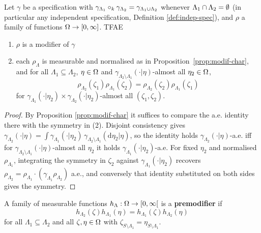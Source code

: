 \begin{proposition}
    \label{prop:modif-indep-char}
    \leanok{}

    Let $\gamma$ be a specification with
    $\gamma_{\Lambda_1} \circ_k \gamma_{\Lambda_2} = \gamma_{\Lambda_1 \cup \Lambda_2}$ whenever
    $\Lambda_1 \cap \Lambda_2 = \emptyset$ (in particular any independent specification,
    Definition \ref{def:indep-spec}), and $\rho$ a family of functions $\Omega \to [0,\infty]$.
    TFAE
    \begin{enumerate}
        \item $\rho$ is a modifier of $\gamma$
        \item each $\rho_\Lambda$ is measurable and normalised as in
        Proposition~\ref{prop:modif-char}, and for all $\Lambda_1 \subseteq \Lambda_2$,
        $\eta \in \Omega$ and $\gamma_{\Lambda_2 \setminus \Lambda_1}(\cdot|\eta)$-almost all
        $\eta_2 \in \Omega$,
        \[\rho_{\Lambda_2}(\zeta_1)\rho_{\Lambda_1}(\zeta_2) = \rho_{\Lambda_2}(\zeta_2) \rho_{\Lambda_1}(\zeta_1)\]
        for $\gamma_{\Lambda_1}(\cdot|\eta_2) \times \gamma_{\Lambda_2}(\cdot|\eta_2)$-almost all $(\zeta_1, \zeta_2)$.
    \end{enumerate}
\end{proposition}
\begin{proof}

    By Proposition \ref{prop:modif-char} it suffices to compare the a.e. identity there with the
    symmetry in (2). Disjoint consistency gives
    $\gamma_{\Lambda_2}(\cdot|\eta) = \int \gamma_{\Lambda_1}(\cdot|\eta_2)\,
    \gamma_{\Lambda_2\setminus\Lambda_1}(\mathrm{d}\eta_2|\eta)$, so the identity holds
    $\gamma_{\Lambda_2}(\cdot|\eta)$-a.e. iff for $\gamma_{\Lambda_2\setminus\Lambda_1}(\cdot|\eta)$-almost
    all $\eta_2$ it holds $\gamma_{\Lambda_1}(\cdot|\eta_2)$-a.e. For fixed $\eta_2$ and
    normalised $\rho_{\Lambda_1}$, integrating the symmetry in $\zeta_2$ against
    $\gamma_{\Lambda_1}(\cdot|\eta_2)$ recovers
    $\rho_{\Lambda_2} = \rho_{\Lambda_1}\cdot(\gamma_{\Lambda_1}\rho_{\Lambda_2})$ a.e., and
    conversely that identity substituted on both sides gives the symmetry.
\end{proof}

\begin{definition}
    \label{def:premodif}
    \leanok

    A family of measurable functions $h_\Lambda : \Omega \to [0, \infty[$ is a {\bf premodifier} if
    $$h_{\Lambda_2}(\zeta)h_{\Lambda_1}(\eta) = h_{\Lambda_1}(\zeta)h_{\Lambda_2}(\eta)$$
    for all $\Lambda_1 \subseteq \Lambda_2$ and all $\zeta, \eta \in \Omega$ with
    $\zeta_{S \setminus \Lambda_1} = \eta_{S \setminus \Lambda_1}$.
\end{definition}

